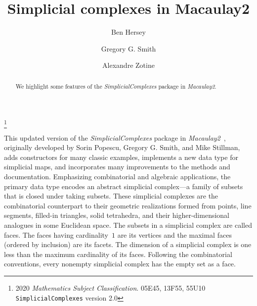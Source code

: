 \documentclass[12pt,leqno]{amsart}
\theoremstyle{definition}
\begin{document}
\vspace*{-4.5em}

\title[Simplicial Complexes]{Simplicial complexes in Macaulay2}

\author[B.~Hersey]{Ben Hersey}
\author[G.G.~Smith]{Gregory G.{} Smith} 
\author[A.~Zotine]{Alexandre Zotine}

\address{Department of Mathematics and Statistics, Queen's
  University, Kingston, Ontario, K7L 3N6
  {\normalfont\texttt{hersey.b@queensu.ca}},
  {\normalfont\texttt{ggsmith@mast.queensu.ca}},
  {\normalfont\texttt{18az45@queensu.ca}}.
}

\thanks{2020 \emph{Mathematics Subject Classification}. 05E45, 13F55,
  55U10\\
  \indent
  \texttt{SimplicialComplexes} version 2.0
}

\begin{abstract}
  We highlight some features of the \emph{SimplicialComplexes} package in
  \emph{Macaulay2}.
\end{abstract}

\maketitle

\vspace{-0.5em}

\noindent
This updated version of the \emph{SimplicialComplexes} package in
\emph{Macaulay2}~\cite{M2}, originally developed by Sorin Popescu, Gregory
G. Smith, and Mike Stillman, adds constructors for many classic examples,
implements a new data type for simplicial maps, and incorporates many
improvements to the methods and documentation.  Emphasizing combinatorial and
algebraic applications, the primary data type encodes an abstract simplicial
complex---a family of subsets that is closed under taking subsets.  These
simplicial complexes are the combinatorial counterpart to their geometric
realizations formed from points, line segments, filled-in triangles, solid
tetrahedra, and their higher-dimensional analogues in some Euclidean space.
The subsets in a simplicial complex are called faces. The faces having
cardinality~$1$ are its vertices and the maximal faces (ordered by inclusion)
are its facets.  The dimension of a simplicial complex is one less than the
maximum cardinality of its faces. Following the combinatorial conventions,
every nonempty simplicial complex has the empty set as a face.
\end{document}

